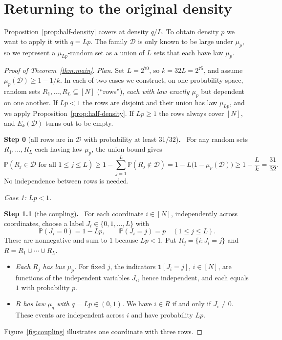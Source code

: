 \documentclass[11pt,letterpaper]{article}
\theoremstyle{definition}
\theoremstyle{remark}
\numberwithin{equation}{section}
\newcommand{\step}[2]{\medskip\noindent\textbf{Step #1} (#2)\textbf{.}\ }
\begin{document}
\section{Returning to the original density}
\label{sec:density}

Proposition~\ref{prop:half-density} covers at density $q/L$. To obtain
density $p$ we want to apply it with $q=Lp$. The family $\mathcal D$ is
only known to be large under $\mu_p$, so we represent a $\mu_{Lp}$-random
set as a union of $L$ sets that each have law $\mu_p$.

\begin{proof}[Proof of Theorem~\ref{thm:main}]
\emph{Plan.} Set $L=2^{70}$, so $k=32L=2^{75}$, and assume
$\mu_p(\mathcal D)\ge1-1/k$. In each of two cases we construct, on one
probability space, random sets $R_1,\ldots,R_L\subseteq[N]$ (``rows''),
\emph{each with law exactly $\mu_p$} but dependent on one another. If
$Lp<1$ the rows are disjoint and their union has law $\mu_{Lp}$, and we
apply Proposition~\ref{prop:half-density}. If $Lp\ge1$ the rows always
cover $[N]$, and $E_k(\mathcal D)$ turns out to be empty.

\step{0}{all rows are in $\mathcal D$ with probability at least $31/32$}
For any random sets $R_1,\ldots,R_L$ each having law $\mu_p$, the union
bound gives
\begin{equation}
\label{eq:all-good-rows}
\mathbb P(R_j\in\mathcal D\text{ for all }1\le j\le L)
\ge1-\sum_{j=1}^L\mathbb P(R_j\notin\mathcal D)
=1-L\bigl(1-\mu_p(\mathcal D)\bigr)
\ge1-\frac Lk=\frac{31}{32}.
\end{equation}
No independence between rows is needed.

\medskip
\noindent\emph{Case 1: $Lp<1$.}

\step{1.1}{the coupling}
For each coordinate $i\in[N]$, independently across coordinates, choose a
label $J_i\in\{0,1,\ldots,L\}$ with
\[
\mathbb P(J_i=0)=1-Lp,
\qquad
\mathbb P(J_i=j)=p\quad(1\le j\le L).
\]
These are nonnegative and sum to $1$ because $Lp<1$. Put
$R_j=\{i:J_i=j\}$ and $R=R_1\cup\cdots\cup R_L$.
\begin{itemize}
\item \emph{Each $R_j$ has law $\mu_p$.} For fixed $j$, the indicators
$\mathbf 1[J_i=j]$, $i\in[N]$, are functions of the independent variables
$J_i$, hence independent, and each equals $1$ with probability $p$.
\item \emph{$R$ has law $\mu_q$ with $q=Lp\in(0,1)$.} We have $i\in R$ if
and only if $J_i\ne0$. These events are independent across $i$ and have
probability $Lp$.
\end{itemize}
Figure~\ref{fig:coupling} illustrates one coordinate with three rows.


\end{proof}
\end{document}
